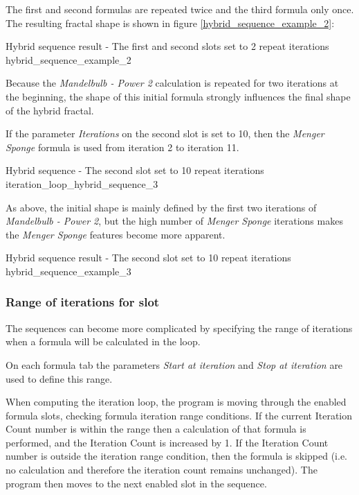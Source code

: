 The first and second formulas are repeated twice and the third formula only once.
The resulting fractal shape is shown in figure \ref{hybrid_sequence_example_2}:

{Hybrid sequence result - The first and second slots set to 2 repeat iterations}
{hybrid_sequence_example_2}

Because the \emph{Mandelbulb - Power 2} calculation is repeated for two iterations at the beginning, the shape of this initial formula strongly influences the final shape of the hybrid fractal.

If the parameter \emph{Iterations} on the second slot is set to 10,
then the \emph{Menger Sponge} formula is used from iteration 2 to iteration 11.

{Hybrid sequence - The second slot set to 10 repeat iterations}
{iteration_loop_hybrid_sequence_3}

As above, the initial shape is mainly defined by the first two iterations of \emph{Mandelbulb - Power 2},
but the high number of \emph{Menger Sponge} iterations makes the \emph{Menger Sponge} features become more apparent.

{Hybrid sequence result - The second slot set to 10 repeat iterations}
{hybrid_sequence_example_3}

\subsubsection{Range of iterations for slot}

The sequences can become more complicated by specifying the range of iterations when a formula will be calculated in the loop.

On each formula tab the parameters \emph{Start at iteration} and \emph{Stop at iteration} are used to define this range.

When computing the iteration loop, the program is moving through the enabled formula slots, checking formula iteration range conditions. If the current Iteration Count number is within the range then a calculation of that formula is performed, and the Iteration Count is increased by 1. If the Iteration Count number is outside the iteration range condition, then the formula is skipped (i.e. no calculation and therefore the iteration count remains unchanged). The program then moves to the next enabled slot in the sequence.

